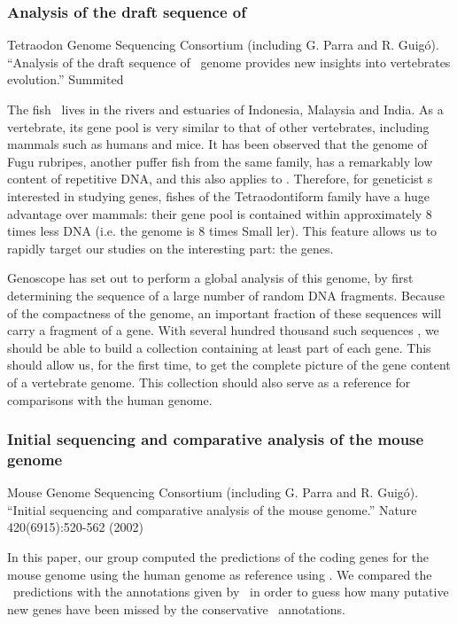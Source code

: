 \subsubsection{Analysis of the draft sequence of \TnL}
Tetraodon Genome Sequencing Consortium (including G. Parra and
R. Guig\'o).  ``Analysis of the draft sequence of \TnL\ genome
provides new insights into vertebrates evolution.'' Summited

The fish \Tn\ lives in the rivers and estuaries of Indonesia,
Malaysia and India. As a vertebrate, its gene pool is very similar to
that of other vertebrates, including mammals such as humans and mice.
It has been observed that the genome of Fugu rubripes, another puffer
fish from the same family, has a remarkably low content of repetitive
DNA, and this also applies to \Tn. Therefore, for geneticist s
interested in studying genes, fishes of the Tetraodontiform family
have a huge advantage over mammals: their gene pool is contained
within approximately 8 times less DNA (i.e. the genome is 8 times Small
ler). This feature allows us to rapidly target our studies on the
interesting part: the genes.

Genoscope has set out to perform a global analysis of this genome,
by first determining the sequence of a large number of random DNA
fragments. Because of the compactness of the genome, an important
fraction of these sequences will carry a fragment of a gene. With
several hundred thousand such sequences , we should be able to build a
collection containing at least part of each gene. This should allow
us, for the first time, to get the complete picture of the gene
content of a vertebrate genome. This collection should also serve as a
reference for comparisons with the human genome.

\subsubsection{Initial sequencing and comparative analysis of the mouse genome}

Mouse Genome Sequencing Consortium (including G. Parra and R. Guig\'o).
``Initial sequencing and comparative analysis of the mouse genome.''
Nature 420(6915):520-562 (2002) 

In this paper, our group computed the predictions of the coding genes
for the mouse genome using the human genome as reference using
\sgp. We compared the \sgp\ predictions with the annotations given by
\ensembl\ in order to guess how many putative new genes have been
missed by the conservative \ensembl\ annotations.



